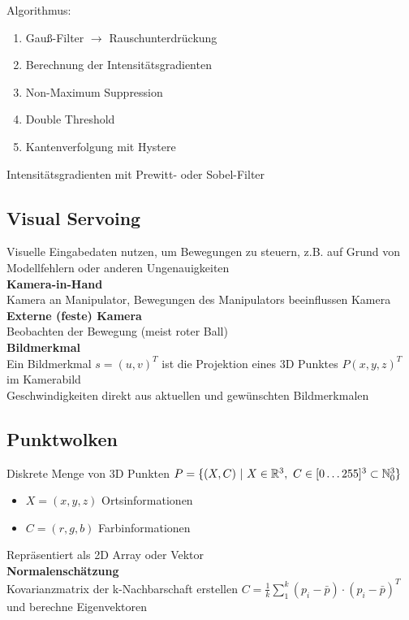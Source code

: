 Algorithmus:
\begin{enumerate}
\item Gauß-Filter \(\rightarrow\) Rauschunterdrückung
\item Berechnung der Intensitätsgradienten
\item Non-Maximum Suppression
\item Double Threshold
\item Kantenverfolgung mit Hystere
\end{enumerate}

Intensitätsgradienten mit Prewitt- oder Sobel-Filter

\subsection{Visual Servoing}
Visuelle Eingabedaten nutzen, um Bewegungen zu steuern, z.B. auf Grund von Modellfehlern oder anderen Ungenauigkeiten\\

\textbf{Kamera-in-Hand}\\
Kamera an Manipulator, Bewegungen des Manipulators beeinflussen Kamera\\

\textbf{Externe (feste) Kamera}\\
Beobachten der Bewegung (meist roter Ball)\\

\textbf{Bildmerkmal}\\
Ein Bildmerkmal \(s = (u,v)^T\) ist die Projektion eines 3D Punktes \(P (x, y, z)^T\) im Kamerabild\\
Geschwindigkeiten direkt aus aktuellen und gewünschten Bildmerkmalen\\

\subsection{Punktwolken}
Diskrete Menge von 3D Punkten \(P = \{(X, C)\ |\ X \in \mathbb{R}^3,\ C \in [0 \ldots 255]^3 \subset \mathbb{N}^3_0\}\)
\begin{itemize}
\item \(X = (x, y, z)\) Ortsinformationen
\item \(C = (r, g, b)\) Farbinformationen
\end{itemize}
Repräsentiert als 2D Array oder Vektor\\

\textbf{Normalenschätzung}\\
Kovarianzmatrix der k-Nachbarschaft erstellen \(C = \frac{1}{k} \sum_1^k (p_i - \bar{p}) \cdot (p_i - \bar{p})^T\)
und berechne Eigenvektoren\\

